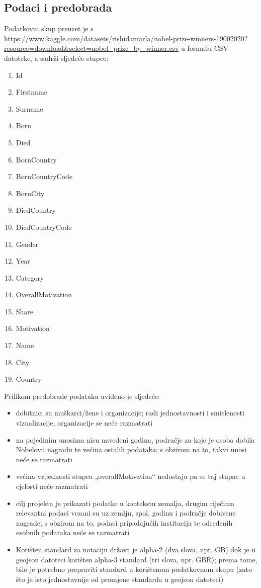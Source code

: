 \documentclass[12pt]{article}
\numberwithin{equation}{section}
\begin{document}
\subsection{Podaci i predobrada}
Podatkovni skup preuzet je s \url{https://www.kaggle.com/datasets/rishidamarla/nobel-prize-winners-19002020?resource=download&select=nobel_prize_by_winner.csv} u formatu CSV datoteke, a sadrži sljedeće stupce:
\begin{multicols}{3}
\begin{enumerate}
    \item Id
    \item Firstname
    \item Surname
    \item Born
    \item Died
    \item BornCountry
    \item BornCountryCode
    \item BornCity
    \item DiedCountry
    \item DiedCountryCode
    \item Gender
    \item Year
    \item Category
    \item OverallMotivation
    \item Share
    \item Motivation
    \item Name
    \item City
    \item Country
\end{enumerate}
\end{multicols}
\newpage
Prilikom predobrade podataka uviđeno je sljedeće:
\begin{itemize}
\item dobitnici su muškarci/žene i organizacije; radi jednostavnosti i smislenosti vizualizacije, organizacije se neće razmatrati

\item na pojedinim unosima nisu navedeni godina, područje za koje je osoba dobila Nobelovu nagradu te većina ostalih podataka; s obzirom na to, takvi unosi neće se razmatrati

\item većina vrijednosti stupca „overallMotivation“ nedostaju pa se taj stupac u cjelosti neće razmatrati

\item cilj projekta je prikazati podatke u kontekstu zemalja, drugim riječima relevantni podaci vezani su uz zemlju, spol, godinu i područje dobivene nagrade; s obzirom na to, podaci pripadajućih institucija te  određenih osobnih podataka neće se razmatrati 

\item Korišten standard za notaciju država je alpha-2 (dva slova, npr. GB) dok je u geojson datoteci korišten alpha-3 standard (tri slova, npr. GBR); prema tome, bilo je potrebno prepraviti standard u korištenom podatkovnom skupu (zato što je isto jednostavnije od promjene standarda u geojson datoteci)
\end{itemize}
\end{document}
